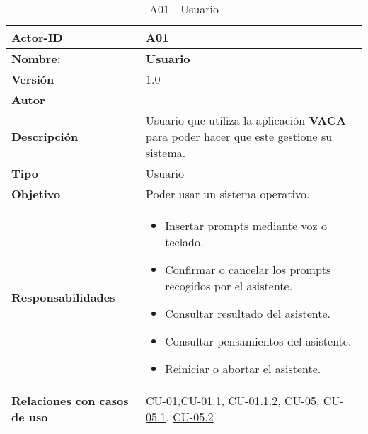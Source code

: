 \begin{table}[H]
	\centering
	\begin{tabularx}{\linewidth}{ p{} p{} }
		\toprule
		\textbf{Actor-ID}    & A01 \\
		\toprule
		\textbf{Nombre: } 			  & \textbf{Usuario} \\
		\textbf{Versión}              & 1.0    \\
		\textbf{Autor}                & \autor \\
		\textbf{Descripción}          & Usuario que utiliza la aplicación \textbf{VACA} para poder hacer que este gestione su sistema.\\
		\textbf{Tipo}                 & Usuario \\
		\textbf{Objetivo}             & Poder usar un sistema operativo. \\
		\textbf{Responsabilidades}    & 
		\begin{itemize}
			\tightlist
			\item Insertar prompts mediante voz o teclado.
            \item Confirmar o cancelar los prompts recogidos por el asistente.
            \item Consultar resultado del asistente.
            \item Consultar pensamientos del asistente.
            \item Reiniciar o abortar el asistente.
		\end{itemize}\\
		\textbf{Relaciones con casos de uso} & \hyperref[CU-01 Enviar prompt al sistema]{CU-01},\hyperref[CU-01.1 Capturar prompt por voz]{CU-01.1}, \hyperref[CU-01.1.2 Confirmar o cancelar prompt]{CU-01.1.2}, \hyperref[CU-05 Mostrar interfaz accesible]{CU-05}, \hyperref[CU-05.1 Presentar resultado del asistente]{CU-05.1}, \hyperref[CU-05.2 Mostrar pensamientos]{CU-05.2}\\
		\bottomrule
	\end{tabularx}
	\caption{A01 - Usuario}
	\label{actor:Usuario}
\end{table}


